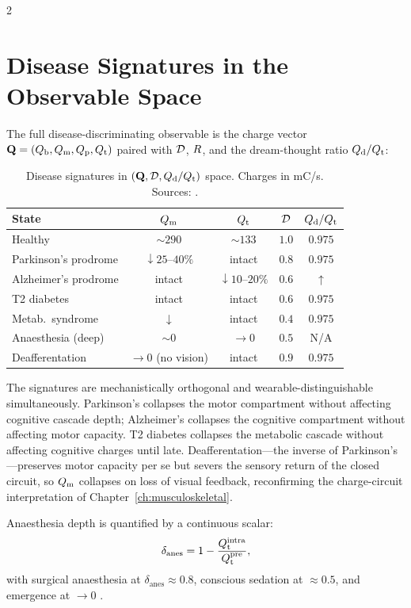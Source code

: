 \begin{multicols}{2}
\section{Disease Signatures in the Observable Space}
\label{sec:ch08-disease}

The full disease-discriminating observable is the charge vector $\mathbf{Q} = (Q_{\mathrm{b}}, Q_{\mathrm{m}}, Q_{\mathrm{p}}, Q_{\mathrm{t}})$ paired with $\mathcal{D}$, $R$, and the dream-thought ratio $Q_{\mathrm{d}}/Q_{\mathrm{t}}$:

\begin{table}[H]
\centering
\footnotesize
\begin{tabular}{lcccc}
\toprule
\textbf{State} & $Q_{\mathrm{m}}$ & $Q_{\mathrm{t}}$ & $\mathcal{D}$ & $Q_{\mathrm{d}}/Q_{\mathrm{t}}$ \\
\midrule
Healthy & $\sim 290$ & $\sim 133$ & $1.0$ & $0.975$ \\
Parkinson's prodrome & $\downarrow 25$--$40\%$ & intact & $0.8$ & $0.975$ \\
Alzheimer's prodrome & intact & $\downarrow 10$--$20\%$ & $0.6$ & $\uparrow$ \\
T2 diabetes & intact & intact & $0.6$ & $0.975$ \\
Metab.\ syndrome & $\downarrow$ & intact & $0.4$ & $0.975$ \\
Anaesthesia (deep) & $\sim 0$ & $\to 0$ & $0.5$ & N/A \\
Deafferentation & $\to 0$ (no vision) & intact & $0.9$ & $0.975$ \\
\bottomrule
\end{tabular}
\caption{Disease signatures in $(\mathbf{Q}, \mathcal{D}, Q_{\mathrm{d}}/Q_{\mathrm{t}})$ space. Charges in mC/s. Sources: \citep{jankovic2008, selkoe2002, bateman2012, defronzo2009, kelley2003, rothwell1982, cole1995}.}
\label{tab:ch08-disease}
\end{table}

The signatures are mechanistically orthogonal and wearable-distinguishable simultaneously. Parkinson's collapses the motor compartment without affecting cognitive cascade depth; Alzheimer's collapses the cognitive compartment without affecting motor capacity. T2 diabetes collapses the metabolic cascade without affecting cognitive charges until late. Deafferentation---the inverse of Parkinson's---preserves motor capacity per se but severs the sensory return of the closed circuit, so $Q_{\mathrm{m}}$ collapses on loss of visual feedback, reconfirming the charge-circuit interpretation of Chapter~\ref{ch:musculoskeletal}.

Anaesthesia depth is quantified by a continuous scalar:
\begin{equation}
\delta_{\mathrm{anes}} = 1 - \frac{Q_{\mathrm{t}}^{\mathrm{intra}}}{Q_{\mathrm{t}}^{\mathrm{pre}}},
\label{eq:ch08-anes}
\end{equation}
with surgical anaesthesia at $\delta_{\mathrm{anes}} \approx 0.8$, conscious sedation at $\approx 0.5$, and emergence at $\to 0$ \citep{kelley2003, davidson2005}.

\end{multicols}

